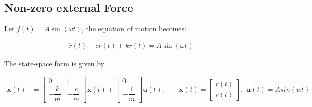 \subsection{Non-zero external Force}

Let \( f(t) = A \sin(\omega t) \), the equation of motion becomes:

\begin{align}
    \ddot{r}(t) + c\dot{r}(t) + k r(t) = A \sin(\omega t)
\end{align}

The state-space form is given by
    
\begin{equation}
    \begin{aligned}
        \dot{\mathbf{x}}(t) &= 
        \begin{bmatrix}
            0 & 1 \\
            -\dfrac{k}{m} & -\dfrac{c}{m}
        \end{bmatrix}
        \mathbf{x}(t) + 
        \begin{bmatrix}
            0 \\
            -\dfrac{1}{m}
        \end{bmatrix}
        \mathbf{u}(t), \quad\quad
        \mathbf{x}(t) = 
        \begin{bmatrix}
            r(t) \\
            \dot{r}(t)
        \end{bmatrix}, \;
        \mathbf{u}(t) = A sin(wt)
    \end{aligned}
    \end{equation}
    